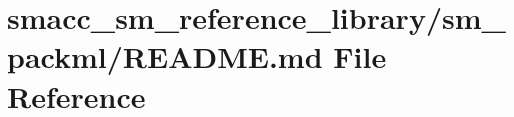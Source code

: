 \hypertarget{smacc__sm__reference__library_2sm__packml_2README_8md}{}\section{smacc\+\_\+sm\+\_\+reference\+\_\+library/sm\+\_\+packml/\+R\+E\+A\+D\+ME.md File Reference}
\label{smacc__sm__reference__library_2sm__packml_2README_8md}

